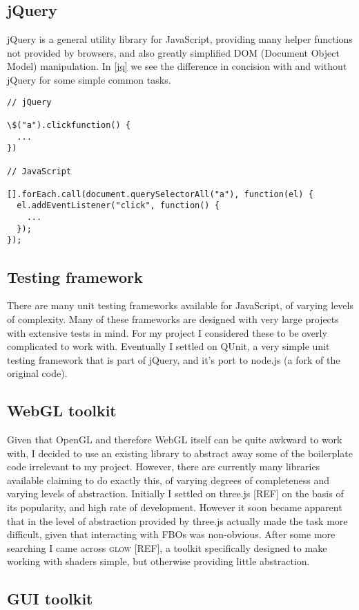 \documentclass[12pt,twoside,notitlepage]{report}
\begin{document}
\subsection{jQuery}
jQuery is a general utility library for JavaScript, providing many helper functions not provided by browsers, and also greatly simplified DOM (Document Object Model) manipulation. In \ref{jq} we see the difference in concision with and without jQuery for some simple common tasks.
\begin{verbatim}
// jQuery

\$("a").clickfunction() {
  ...
})

// JavaScript

[].forEach.call(document.querySelectorAll("a"), function(el) {
  el.addEventListener("click", function() {
    ...
  });
});
\end{verbatim}

\subsection{Testing framework}
There are many unit testing frameworks available for JavaScript, of varying levels of complexity. Many of these frameworks are designed with very large projects with extensive tests in mind. For my project I considered these to be overly complicated to work with. Eventually I settled on QUnit, a very simple unit testing framework that is part of jQuery, and it's port to node.js (a fork of the original code).

\subsection{WebGL toolkit}
Given that OpenGL and therefore WebGL itself can be quite awkward to work with, I decided to use an existing library to abstract away some of the boilerplate code irrelevant to my project. However, there are currently many libraries available claiming to do exactly this, of varying degrees of completeness and varying levels of abstraction. Initially I settled on three.js [REF] on the basis of its popularity, and high rate of development. However it soon became apparent that in the level of abstraction provided by three.js actually made the task more difficult, given that interacting with FBOs was non-obvious. After some more searching I came across \textsc{glow} [REF], a toolkit specifically designed to make working with shaders simple, but otherwise providing little abstraction.

\subsection{GUI toolkit}
\end{document}
